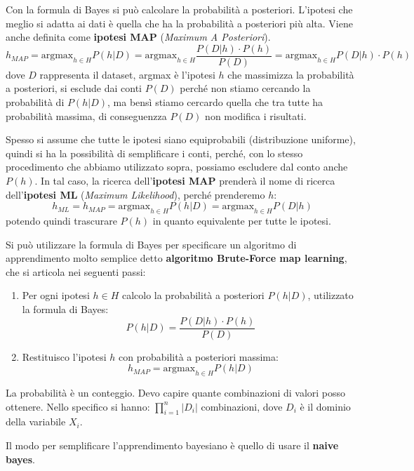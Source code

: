 Con la formula di Bayes si può calcolare la probabilità a posteriori. L'ipotesi
che meglio si adatta ai dati è quella che ha la probabilità a posteriori più alta.
Viene anche definita come \textbf{ipotesi MAP} (\textit{Maximum A Posteriori}).
\begin{equation}
    h_{MAP} = \text{argmax}_{h \in H} P(h|D) = \text{argmax}_{h \in H} \frac{P(D|h)
        \cdot P(h)}{P(D)} = \text{argmax}_{h \in H} P(D|h) \cdot P(h)
\end{equation}
dove $D$ rappresenta il dataset, argmax è l'ipotesi $h$ che massimizza la probabilità
a posteriori, si esclude dai conti $P(D)$ perché non stiamo cercando la probabilità
di $P(h|D)$, ma bensì stiamo cercardo quella che tra tutte ha probabilità massima,
di conseguenzza $P(D)$ non modifica i risultati.

Spesso si assume che tutte le ipotesi siano equiprobabili (distribuzione uniforme),
quindi si ha la possibilità di semplificare i conti, perché, con lo stesso
procedimento che abbiamo utilizzato sopra, possiamo escludere dal conto anche $P(h)$.
In tal caso, la ricerca dell'\textbf{ipotesi MAP} prenderà il nome di ricerca
dell'\textbf{ipotesi ML} (\textit{Maximum Likelihood}), perché prenderemo $h$:
\begin{equation}
    h_{ML} = h_{MAP} =\text{argmax}_{h \in H} P(h|D) =\text{argmax}_{h \in H} P(D|h)
\end{equation}
potendo quindi trascurare $P(h)$ in quanto equivalente per tutte le ipotesi.

Si può utilizzare la formula di Bayes per specificare un algoritmo di apprendimento
molto semplice detto \textbf{algoritmo Brute-Force map learning}, che si articola
nei seguenti passi:
\begin{enumerate}
    \item Per ogni ipotesi $h \in H$ calcolo la probabilità a posteriori $P(h|D)$,
          utilizzato la formula di Bayes:
          \begin{equation}
              P(h|D) = \frac{P(D|h) \cdot P(h)}{P(D)}
          \end{equation}
    \item Restituisco l'ipotesi $h$ con probabilità a posteriori massima:
          \begin{equation}
              h_{MAP} = \text{argmax}_{h \in H} P(h|D)
          \end{equation}
\end{enumerate}
\begin{nota}
    La probabilità è un conteggio. Devo capire quante combinazioni di valori posso
    ottenere. Nello specifico si hanno: $\prod_{i=1}^n |D_i|$ combinazioni, dove
    $D_i$ è il dominio della variabile $X_i$.
\end{nota}
Il modo per semplificare l'apprendimento bayesiano è quello di usare il \textbf{naive bayes}.

